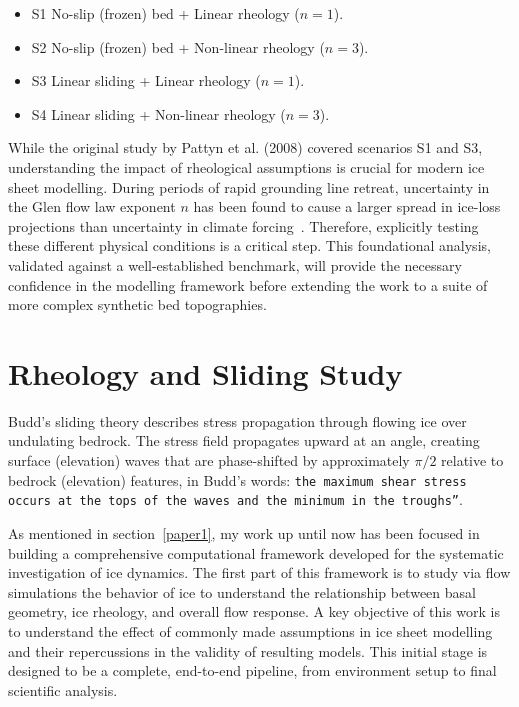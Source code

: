 \begin{itemize}
\item{S1} No-slip (frozen) bed + Linear rheology ($n=1$).
\item{S2} No-slip (frozen) bed + Non-linear rheology ($n=3$).
\item{S3} Linear sliding + Linear rheology ($n=1$).
\item{S4} Linear sliding + Non-linear rheology ($n=3$).
\end{itemize}

While the original study by Pattyn et al. (2008) covered scenarios S1 and S3, understanding the impact of rheological assumptions is crucial for modern ice sheet modelling. During periods of rapid grounding line retreat, uncertainty in the Glen flow law exponent $n$ has been found to cause a larger spread in ice-loss projections than uncertainty in climate forcing~\cite{Getraer_2025}. Therefore, explicitly testing these different physical conditions is a critical step. This foundational analysis, validated against a well-established benchmark, will provide the necessary confidence in the modelling framework before extending the work to a suite of more complex synthetic bed topographies.



\section{Rheology and Sliding Study}\label{study1}
Budd's sliding theory describes stress propagation through flowing ice over undulating bedrock. The stress field propagates upward at an angle, creating surface (elevation) waves that are phase-shifted by approximately $\pi/2$ relative to bedrock (elevation) features, in Budd's words: \texttt{\texttt{the maximum shear stress occurs at the tops of the waves and the minimum in the troughs''\cite{Budd_1970}}}. 

As mentioned in section~\ref{paper1}, my work up until now has been focused in building a comprehensive computational framework developed for the systematic investigation of ice dynamics. The first part of this framework is to study via flow simulations the behavior of ice to understand the relationship between basal geometry, ice rheology, and overall flow response. A key objective of this work is to understand the effect of commonly made assumptions in ice sheet modelling and their repercussions in the validity of resulting models. This initial stage is designed to be a complete, end-to-end pipeline, from environment setup to final scientific analysis. 

